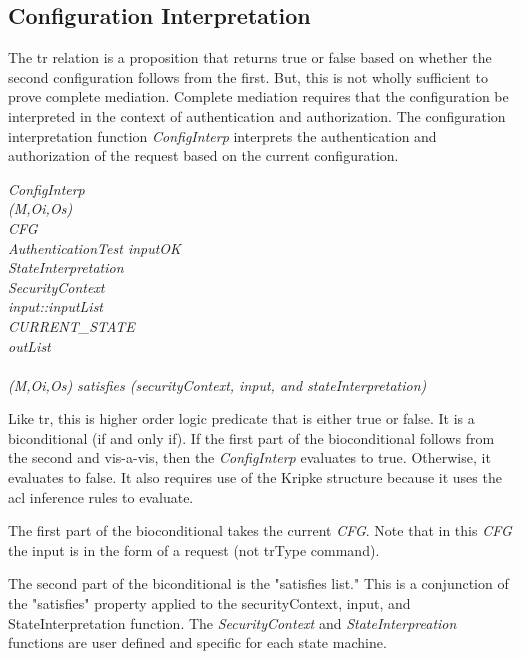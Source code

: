 \documentclass[../../main/main.tex]{subfiles}
\begin{document}
\subsection{Configuration Interpretation}
The \gls{tr} relation is a proposition that returns true or false based on whether the second configuration follows from the first.  But, this is not wholly sufficient to prove complete mediation.  Complete mediation requires that the configuration be interpreted in the context of authentication and authorization.  The configuration interpretation function \emph{ConfigInterp} interprets the authentication and authorization of the request based on the current configuration.  

\emph{
ConfigInterp\\
\hspace{1cm}(M,Oi,Os)\\
\hspace{1cm}CFG\\
\hspace{2cm}AuthenticationTest inputOK\\
\hspace{2cm}StateInterpretation \\
\hspace{2cm}SecurityContext\\
\hspace{2cm}input::inputList\\
\hspace{2cm}CURRENT_STATE\\
\hspace{2cm}outList\\
\hspace{1cm}\HOLSymConst{\HOLTokenEquiv{}}\\
\hspace{1cm} (M,Oi,Os) satisfies (securityContext, input, and stateInterpretation)
}

Like \gls{tr}, this is higher order logic predicate that is either true or false.  It is a biconditional (if and only if).  If the first part of the bioconditional follows from the second and vis-a-vis, then the \emph{ConfigInterp} evaluates to true.  Otherwise, it evaluates to false.  It also requires use of the Kripke structure because it uses the \gls{acl} inference rules to evaluate.  

The first part of the bioconditional takes the current \emph{CFG}.  Note that in this \emph{CFG} the input is in the form of a request (not trType command).  

The second part of the biconditional is the "satisfies list."  This is a conjunction of the "satisfies" property applied to the securityContext, input, and StateInterpretation function. The \emph{SecurityContext} and \emph{StateInterpreation} functions are user defined and specific for each state machine.
\end{document}
